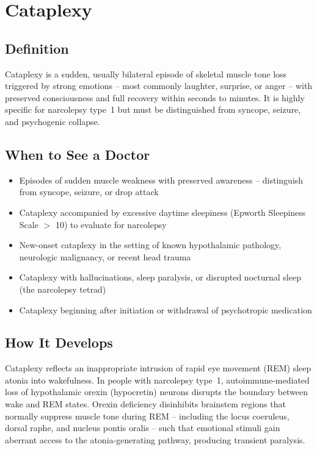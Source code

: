 \chapter{Cataplexy}

\section*{Definition}
Cataplexy is a sudden, usually bilateral episode of skeletal muscle tone loss triggered by strong emotions -- most commonly laughter, surprise, or anger -- with preserved consciousness and full recovery within seconds to minutes. It is highly specific for narcolepsy type~1 but must be distinguished from syncope, seizure, and psychogenic collapse.

\section*{When to See a Doctor}

\begin{itemize}
 \item Episodes of sudden muscle weakness with preserved awareness -- distinguish from syncope, seizure, or drop attack
 \item Cataplexy accompanied by excessive daytime sleepiness (Epworth Sleepiness Scale $>$ 10) to evaluate for narcolepsy
 \item New-onset cataplexy in the setting of known hypothalamic pathology, neurologic malignancy, or recent head trauma
 \item Cataplexy with hallucinations, sleep paralysis, or disrupted nocturnal sleep (the narcolepsy tetrad)
 \item Cataplexy beginning after initiation or withdrawal of psychotropic medication
\end{itemize}

\section*{How It Develops}
Cataplexy reflects an inappropriate intrusion of rapid eye movement (REM) sleep atonia into wakefulness. In people with narcolepsy type~1, autoimmune-mediated loss of hypothalamic orexin (hypocretin) neurons disrupts the boundary between wake and REM states. Orexin deficiency disinhibits brainstem regions that normally suppress muscle tone during REM -- including the locus coeruleus, dorsal raphe, and nucleus pontis oralis -- such that emotional stimuli gain aberrant access to the atonia-generating pathway, producing transient paralysis.

